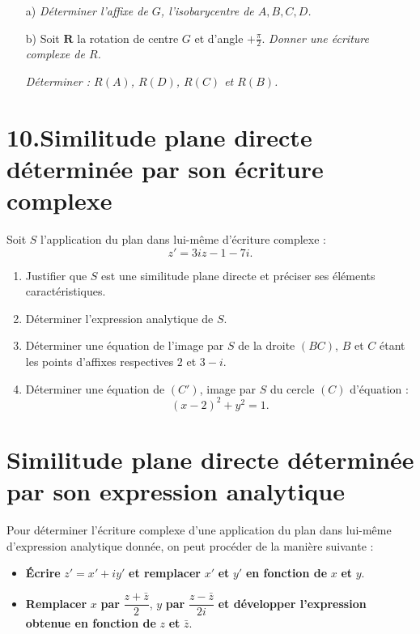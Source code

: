 \documentclass[12pt,a4paper]{article}
\begin{document}
\begin{itemize}
    \item[a)] \textit{Déterminer l’affixe de \( G \), l’isobarycentre de \( A, B, C, D \).}
    
    \item[b)] Soit \(\mathbf{R}\) la rotation de centre \( G \) et d’angle \( +\frac{\pi}{2} \). \textit{Donner une écriture complexe de \( R \).}
    
    \textit{Déterminer : \( R(A) \), \( R(D) \), \( R(C) \) et \( R(B) \).}
\end{itemize}

\section*{10.Similitude plane directe déterminée par son écriture complexe}

\vspace{0.3cm}

Soit \( S \) l’application du plan dans lui-même d’écriture complexe :
\[
z' = 3i z - 1 - 7i.
\]

\begin{enumerate}
    \item Justifier que \( S \) est une similitude plane directe et préciser ses éléments caractéristiques.
    
    \item Déterminer l’expression analytique de \( S \).
    
    \item Déterminer une équation de l’image par \( S \) de la droite \( (BC) \), \( B \) et \( C \) étant les points d’affixes respectives \( 2 \) et \( 3 - i \).
    \item Déterminer une équation de \( (C') \), image par \( S \) du cercle \( (C) \) d’équation :
\[
(x - 2)^2 + y^2 = 1.
\]

\end{enumerate}
\section*{Similitude plane directe déterminée par son expression analytique}

\vspace{0.3cm}

Pour déterminer l’écriture complexe d’une application du plan dans lui-même d’expression analytique donnée, on peut procéder de la manière suivante :

\begin{itemize}
    \item \textbf{Écrire} \( z' = x' + i y' \) \textbf{et remplacer} \( x' \) \textbf{et} \( y' \) \textbf{en fonction de} \( x \) \textbf{et} \( y \).
    \item \textbf{Remplacer} \( x \) \textbf{par} \( \dfrac{z + \bar{z}}{2} \), \quad \( y \) \textbf{par} \( \dfrac{z - \bar{z}}{2i} \) \textbf{et développer l’expression obtenue en fonction de} \( z \) \textbf{et} \( \bar{z} \).
\end{itemize}
\end{document}
